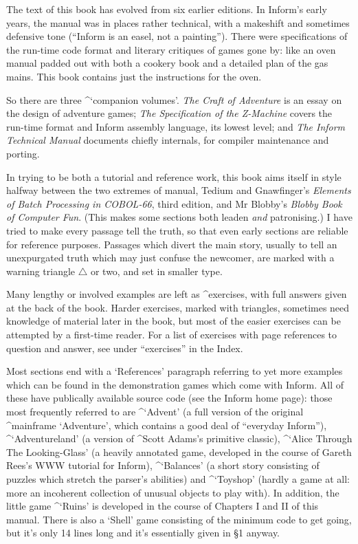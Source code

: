 The text of this book has evolved from six earlier editions.  In Inform's
early years, the manual was in places rather technical, with a makeshift and
sometimes defensive tone (``Inform is an easel, not a painting'').  There were
specifications of the run-time code format and literary critiques of games
gone by: like an oven manual padded out with both a cookery book and a
detailed plan of the gas mains.  This book contains just the instructions
for the oven.

So there are three ^{`companion volumes'}.  {\sl The Craft of Adventure} is
an essay on the design of adventure games;  {\sl The Specification of the
Z-Machine} covers the run-time format and Inform assembly language, its
lowest level; and {\sl The Inform Technical Manual} documents chiefly
internals, for compiler maintenance and porting.

In trying to be both a tutorial and reference work, this book aims itself
in style halfway between the two extremes of manual, Tedium and Gnawfinger's
{\sl Elements of Batch Processing in COBOL-66}, third edition, and Mr Blobby's
{\sl Blobby Book of Computer Fun}.  (This makes some sections both leaden
{\sl and} patronising.)  I have tried to make every passage tell the truth,
so that even early sections are reliable for reference purposes.  Passages
which divert the main story, usually to tell an unexpurgated truth which may
just confuse the newcomer, are marked with a warning triangle $\triangle$ or
two, and set in smaller type.

Many lengthy or involved examples are left as ^{exercises}, with full answers
given at the back of the book.  Harder exercises, marked with triangles,
sometimes need knowledge of material later in the book, but most of the
easier exercises can be attempted by a first-time reader.  For a list of
exercises with page references to question and answer, see under
``exercises'' in the Index.

Most sections end with a `References' paragraph referring to yet more
examples which can be found in the demonstration games which come with
Inform.  All of these have publically available source code (see the Inform
home page): those most frequently referred to are ^{`Advent'} (a full
version of the original ^{mainframe `Adventure'}, which contains a good deal
of ``everyday Inform''), ^{`Adventureland'} (a version of ^{Scott Adams}'s
primitive classic), ^{`Alice Through The Looking-Glass'} (a heavily
annotated game, developed in the course of Gareth Rees's WWW tutorial for
Inform), ^{`Balances'} (a short story consisting of puzzles which stretch
the parser's abilities) and ^{`Toyshop'} (hardly a game at all: more an
incoherent collection of unusual objects to play with).  In addition, the
little game ^{`Ruins'} is developed in the course of Chapters I and II of
this manual.  There is also a `Shell' game consisting of the minimum code to
get going, but it's only 14 lines long and it's essentially given in \S 1
anyway.

